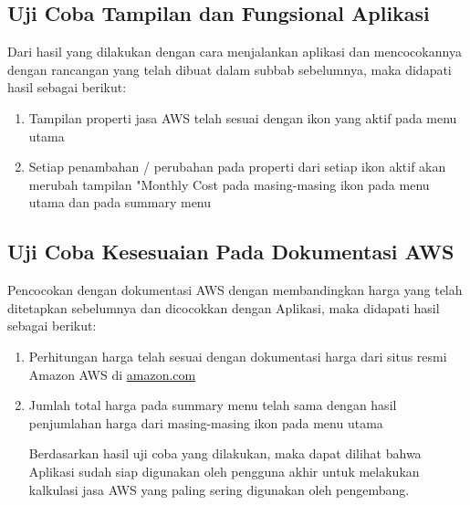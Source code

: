 \documentclass[pi.tex]{subfile}
\begin{document}
\subsection{Uji Coba Tampilan dan Fungsional Aplikasi}\hspace{5pt}
Dari hasil yang dilakukan dengan cara menjalankan aplikasi dan mencocokannya dengan rancangan yang telah dibuat dalam subbab sebelumnya, maka didapati hasil sebagai berikut:
\begin{enumerate}
\item Tampilan properti jasa AWS telah sesuai dengan ikon yang aktif pada menu utama
\item Setiap penambahan / perubahan pada properti dari setiap ikon aktif akan merubah tampilan "Monthly Cost pada masing-masing ikon pada menu utama dan pada summary menu
\end{enumerate}

\subsection{Uji Coba Kesesuaian Pada Dokumentasi AWS}\hspace{5pt}
Pencocokan dengan dokumentasi AWS dengan membandingkan harga yang telah ditetapkan sebelumnya dan dicocokkan dengan Aplikasi, maka didapati hasil sebagai berikut:
\begin{enumerate}

\item Perhitungan harga telah sesuai dengan dokumentasi harga dari situs resmi Amazon AWS di \url{amazon.com}
\item Jumlah total harga pada summary menu telah sama dengan hasil penjumlahan harga dari masing-masing ikon pada menu utama

\hspace{5pt}Berdasarkan hasil uji coba yang dilakukan, maka dapat dilihat bahwa Aplikasi sudah siap digunakan oleh pengguna akhir untuk melakukan kalkulasi jasa AWS yang paling sering digunakan oleh pengembang.
\end{enumerate}
\end{document}

